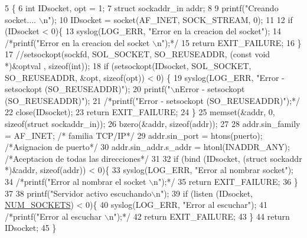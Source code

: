 \begin{DoxyCode}
5                                \{
6         \textcolor{keywordtype}{int} IDsocket, opt = 1;
7         \textcolor{keyword}{struct }sockaddr\_in addr;
8 
9         printf(\textcolor{stringliteral}{"Creando socket.... \(\backslash\)n"});
10         IDsocket = socket(AF\_INET, SOCK\_STREAM, 0);
11 
12         \textcolor{keywordflow}{if} (IDsocket < 0)\{
13                 syslog(LOG\_ERR, \textcolor{stringliteral}{"Error en la creacion del socket"});
14                 \textcolor{comment}{/*printf("Error en la creacion del socket \(\backslash\)n");*/}
15                 \textcolor{keywordflow}{return} EXIT\_FAILURE;
16         \}
17                 \textcolor{comment}{//setsockopt(sockfd, SOL\_SOCKET, SO\_REUSEADDR, (const void *)&optval , sizeof(int));}
18         \textcolor{keywordflow}{if} (setsockopt(IDsocket, SOL\_SOCKET, SO\_REUSEADDR, &opt, \textcolor{keyword}{sizeof}(opt)) < 0) \{
19                 syslog(LOG\_ERR, \textcolor{stringliteral}{"Error - setsockopt (SO\_REUSEADDR)"});
20                 printf(\textcolor{stringliteral}{"\(\backslash\)nError - setsockopt (SO\_REUSEADDR)"});
21                 \textcolor{comment}{/*printf("Error - setsockopt (SO\_REUSEADDR)");*/}
22                 close(IDsocket);
23                 \textcolor{keywordflow}{return} EXIT\_FAILURE;
24         \}
25         memset(&addr, 0, \textcolor{keyword}{sizeof}(\textcolor{keyword}{struct} sockaddr\_in));
26         bzero(&addr, \textcolor{keyword}{sizeof}(addr));
27 
28         addr.sin\_family = AF\_INET; \textcolor{comment}{/* familia TCP/IP*/}
29         addr.sin\_port = htons(puerto); \textcolor{comment}{/*Asignacion de puerto*/}
30         addr.sin\_addr.s\_addr = htonl(INADDR\_ANY); \textcolor{comment}{/*Aceptacion de todas las direcciones*/}
31 
32         \textcolor{keywordflow}{if} (bind (IDsocket, (\textcolor{keyword}{struct} sockaddr *)&addr, \textcolor{keyword}{sizeof}(addr)) < 0)\{
33                 syslog(LOG\_ERR, \textcolor{stringliteral}{"Error al nombrar socket"});
34                 \textcolor{comment}{/*printf("Error al nombrar el socket \(\backslash\)n");*/}
35                 \textcolor{keywordflow}{return} EXIT\_FAILURE;
36         \}
37 
38         printf(\textcolor{stringliteral}{"Servidor activo escuchando\(\backslash\)n"});
39         \textcolor{keywordflow}{if} (listen (IDsocket, \hyperlink{_g-2361-06-_p1-_server_8h_a1c803e4ececfb47d2791c9283c85eb00}{NUM\_SOCKETS}) < 0)\{
40                 syslog(LOG\_ERR, \textcolor{stringliteral}{"Error al escuchar"});
41                 \textcolor{comment}{/*printf("Error al escuchar \(\backslash\)n");*/}
42                 \textcolor{keywordflow}{return} EXIT\_FAILURE;
43         \}
44         \textcolor{keywordflow}{return} IDsocket;
45 \}
\end{DoxyCode}
\hypertarget{_g-2361-06-_p1-_sockets_8c_a172e85f036cff044fd5ba218460115c7}{}
